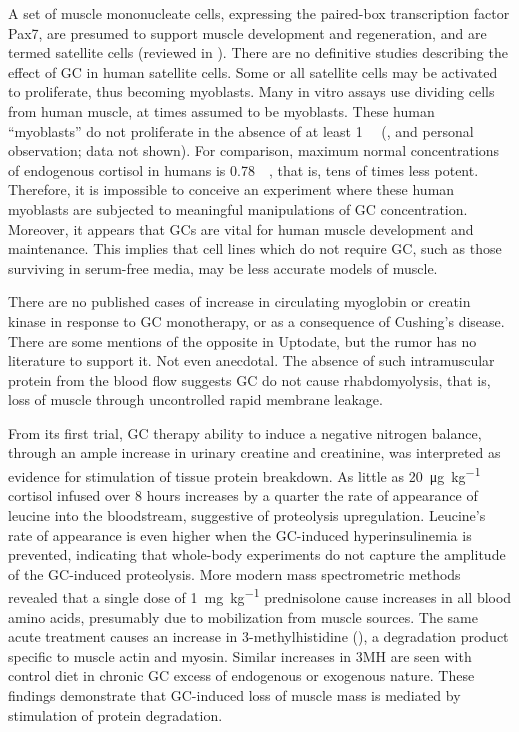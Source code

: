 \documentclass[12pt,english]{report}\usepackage[]{graphicx}\usepackage[]{color}
\newenvironment{lyxgreyedout}
  {\textcolor{note_fontcolor}\bgroup\ignorespaces}
  {\ignorespacesafterend\egroup}
\begin{document}
A set of muscle mononucleate cells, expressing the paired-box transcription
factor Pax7, are presumed to support muscle development and regeneration,
and are termed satellite cells (reviewed in \citep{legrand2007skeletal}).
There are no definitive studies describing the effect of GC in human
satellite cells. Some or all satellite cells may be activated to proliferate,
thus becoming myoblasts. Many in vitro assays use dividing cells from
human muscle, at times assumed to be myoblasts. These human ``myoblasts''
do not proliferate in the absence of at least \SI{1}{\micro\molar}
(\citep{ham1988improved}, and personal observation; data not shown).
For comparison, maximum normal concentrations of endogenous cortisol
in humans is \SI{0.78}{\micro\molar}\citep{griffing2014serum}, that
is, tens of times less potent. Therefore, it is impossible to conceive
an experiment where these human myoblasts are subjected to meaningful
manipulations of GC concentration. Moreover, it appears that GCs are
vital for human muscle development and maintenance. This implies that
cell lines which do not require GC, such as those surviving in serum-free
media, may be less accurate models of muscle.

There are no published cases of increase in circulating myoglobin
or creatin kinase in response to GC monotherapy, or as a consequence
of Cushing's disease.%
\begin{lyxgreyedout}
There are some mentions of the opposite in Uptodate, but the rumor
has no literature to support it. Not even anecdotal.%
\end{lyxgreyedout}
{} The absence of such intramuscular protein from the blood flow suggests
GC do not cause rhabdomyolysis, that is, loss of muscle through uncontrolled
rapid membrane leakage.

From its first trial, GC therapy ability to induce a negative nitrogen
balance, through an ample increase in urinary creatine and creatinine,
was interpreted as evidence for stimulation of tissue protein breakdown\citep{sprague1950physiological}.
As little as \SI{20}{\micro\gram\per\kilo\gram} cortisol infused
over 8 hours increases by a quarter the rate of appearance of leucine
into the bloodstream, suggestive of proteolysis upregulation\citep{simmons1984increased}.
Leucine's rate of appearance is even higher when the GC-induced hyperinsulinemia
is prevented, indicating that whole-body experiments do not capture
the amplitude of the GC-induced proteolysis\citep{brillon1995effect}.
More modern mass spectrometric methods revealed that a single dose
of \SI{1}{\milli\gram\per\kilo\gram} prednisolone cause increases
in all blood amino acids, presumably due to mobilization from muscle
sources\citep{ellero-simatos2012assessing}. The same acute treatment
causes an increase in 3-methylhistidine (),
a degradation product specific to muscle actin and myosin\citep{elia1981clinical}.
Similar increases in 3MH are seen with control diet in chronic GC
excess of endogenous or exogenous nature\citep{khaleeli1983corticosteroid}.
These findings demonstrate that GC-induced loss of muscle mass is
mediated by stimulation of protein degradation.
\end{document}

